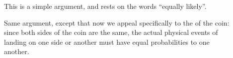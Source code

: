 \begin{itemize}
\begin{description}
\item[]
This is a simple argument, and rests on the words ``equally likely''. 
\item[]
Same argument, except that now we appeal specifically to the  of the coin: since both sides of the coin are the same, the actual physical events of landing on one side or another must have equal probabilities to one another.
\item[]

\item[]
\end{description}

\end{itemize}
